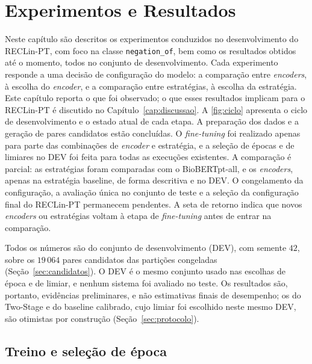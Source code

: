 \chapter[Experimentos e Resultados]{Experimentos e Resultados}
\label{cap:experimentos}

Neste capítulo são descritos os experimentos conduzidos no desenvolvimento do
RECLin-PT, com foco na classe \texttt{negation\_of}, bem como os resultados obtidos
até o momento, todos no conjunto de desenvolvimento. Cada experimento responde a uma
decisão de configuração do modelo: a comparação entre \emph{encoders}, à escolha do
\emph{encoder}, e a comparação entre estratégias, à escolha da estratégia. Este
capítulo reporta o que foi observado; o que esses resultados implicam para o
RECLin-PT é discutido no Capítulo~\ref{cap:discussao}. A \autoref{fig:ciclo} apresenta
o ciclo de desenvolvimento e o estado atual de cada etapa. A preparação dos dados e a
geração de pares candidatos estão concluídas. O \emph{fine-tuning} foi realizado
apenas para parte das combinações de \emph{encoder} e estratégia, e a seleção de
épocas e de limiares no DEV foi feita para todas as execuções existentes. A
comparação é parcial: as estratégias foram comparadas com o BioBERTpt-all, e os
\emph{encoders}, apenas na estratégia baseline, de forma descritiva e no DEV. O
congelamento da configuração, a avaliação única no conjunto de teste e a seleção da
configuração final do RECLin-PT permanecem pendentes. A seta de retorno indica que
novos \emph{encoders} ou estratégias voltam à etapa de \emph{fine-tuning} antes de
entrar na comparação.



Todos os números são do conjunto de desenvolvimento (DEV), com semente $42$, sobre os
$19\,064$ pares candidatos das partições congeladas (Seção~\ref{sec:candidatos}). O
DEV é o mesmo conjunto usado nas escolhas de época e de limiar, e nenhum sistema foi avaliado no teste. Os resultados são, portanto,
evidências preliminares, e não estimativas finais de desempenho; os do
Two-Stage e do baseline calibrado, cujo limiar foi escolhido neste mesmo DEV, são
otimistas por construção (Seção~\ref{sec:protocolo}).

\section{Treino e seleção de época}
\label{sec:curvas}


